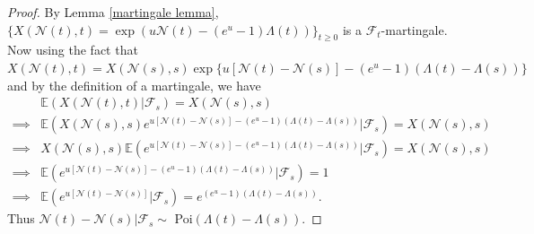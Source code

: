 \documentclass[11pt,oneside,reqno]{amsart}
\theoremstyle{definition}
\theoremstyle{remarkstyle}
\begin{document}
\begin{proof}
By Lemma \ref{martingale lemma}, $\{X(\mathcal{N}(t),t)=\exp(u\mathcal{N}(t)-(e^u-1)\Lambda(t))\}_{t\ge 0}$ is a $\mathcal{F}_t$-martingale.
Now using the fact that $X(\mathcal{N}(t),t)=X(\mathcal{N}(s),s)\exp\{u[\mathcal{N}(t)-\mathcal{N}(s)]-(e^u-1)\left(\Lambda(t)-\Lambda(s)\right)\}$ and by the definition of a martingale, we have
\begin{align}
    &\mathbb{E}\left(X(\mathcal{N}(t),t)\big|\mathcal{F}_s\right)=X(\mathcal{N}(s),s)\nonumber\\
    \implies&\mathbb{E}\left(X(\mathcal{N}(s),s)e^{u[\mathcal{N}(t)-\mathcal{N}(s)]-(e^u-1)\left(\Lambda(t)-\Lambda(s)\right)}\big|\mathcal{F}_s\right)=X(\mathcal{N}(s),s)\nonumber\\
    \implies &X(\mathcal{N}(s),s)\mathbb{E}\left(e^{u[\mathcal{N}(t)-\mathcal{N}(s)]-(e^u-1)\left(\Lambda(t)-\Lambda(s)\right)}\big|\mathcal{F}_s\right)=X(\mathcal{N}(s),s)\nonumber\\
    \implies &\mathbb{E}\left(e^{u[\mathcal{N}(t)-\mathcal{N}(s)]-(e^u-1)\left(\Lambda(t)-\Lambda(s)\right)}\big|\mathcal{F}_s\right)=1\nonumber\\
    \implies &\mathbb{E}\left(e^{u[\mathcal{N}(t)-\mathcal{N}(s)]}\big|\mathcal{F}_s\right)=e^{(e^u-1)\left(\Lambda(t)-\Lambda(s)\right)}.\label{increment_distribution_npp}
\end{align}
Thus $\mathcal{N}(t)-\mathcal{N}(s)\big|\mathcal{F}_s\sim$ Poi$\left(\Lambda(t)-\Lambda(s)\right)$.

\end{proof}
\end{document}
